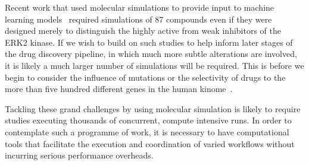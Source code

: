 Recent work that used molecular simulations to provide input to machine
learning models~\cite{Ash2017} required simulations of 87 compounds even if
they were designed merely to distinguish the highly active from weak
inhibitors of the ERK2 kinase. If we wish to build on such studies to help
inform later stages of the drug discovery pipeline, in which much more subtle
alterations are involved, it is likely a much larger number of simulations
will be required. This is before we begin to consider the influence of
mutations or the selectivity of drugs to the more than five hundred different
genes in the human kinome~\cite{Li2016}.


Tackling these grand challenges by
using molecular simulation is likely to require studies executing thousands
of concurrent, compute intensive runs. In order to contemplate such a
programme of work, it is necessary to have computational tools that
facilitate the execution and coordination of varied workflows without
incurring serious performance overheads.





